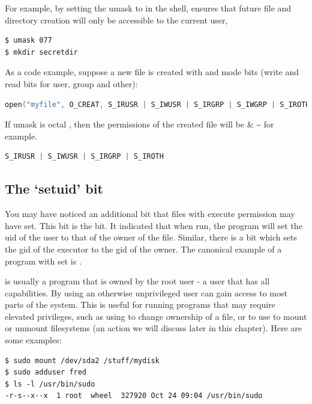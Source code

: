 For example, by setting the umask to  in the shell, ensures that future file and directory creation will only be accessible to the current user,

\begin{verbatim}
$ umask 077
$ mkdir secretdir
\end{verbatim}

As a code example, suppose a new file is created with  and mode bits  (write and read bits for user, group and other):

\begin{lstlisting}[language=C]
open("myfile", O_CREAT, S_IRUSR | S_IWUSR | S_IRGRP | S_IWGRP | S_IROTH | S_IWOTH);
\end{lstlisting}

If umask is octal , then the permissions of the created file will be  \& \textasciitilde{} for example.

\begin{lstlisting}[language=C]
S_IRUSR | S_IWUSR | S_IRGRP | S_IROTH
\end{lstlisting}

\subsection{The `setuid' bit}

You may have noticed an additional bit that files with execute permission may have set.
This bit is the  bit.
It indicated that when run, the program will set the uid of the user to that of the owner of the file.
Similar, there is a  bit which sets the gid of the executor to the gid of the owner.
The canonical example of a program with  set is .

 is usually a program that is owned by the root user - a user that has all capabilities.
By using  an otherwise unprivileged user can gain access to most parts of the system.
This is useful for running programs that may require elevated privileges, such as using  to change ownership of a file, or to use  to mount or unmount filesystems (an action we will discuss later in this chapter).
Here are some examples:

\begin{verbatim}
$ sudo mount /dev/sda2 /stuff/mydisk
$ sudo adduser fred
$ ls -l /usr/bin/sudo
-r-s--x--x  1 root  wheel  327920 Oct 24 09:04 /usr/bin/sudo
\end{verbatim}

